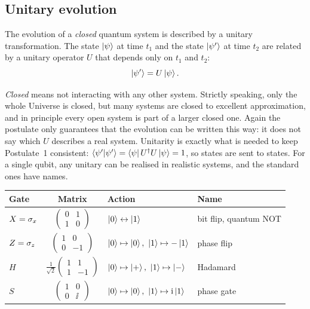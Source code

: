 \subsection{Unitary evolution}

\begin{postulate}[Evolution]\label{post:evolution}
  The evolution of a \emph{closed} quantum system is described by a unitary transformation. The state $\left|\psi\right\rangle$ at time $t_1$ and the state $\left|\psi'\right\rangle$ at time $t_2$ are related by a unitary operator $U$ that depends only on $t_1$ and $t_2$:
  \[
    \left|\psi'\right\rangle=U\left|\psi\right\rangle .
  \]
\end{postulate}

\emph{Closed} means not interacting with any other system. Strictly speaking, only the whole Universe is closed, but many systems are closed to excellent approximation, and in principle every open system is part of a larger closed one.
Again the postulate only guarantees that the evolution can be written this way: it does not say which $U$ describes a real system. Unitarity is exactly what is needed to keep Postulate~1 consistent: $\left\langle\psi'\middle|\psi'\right\rangle=\left\langle\psi\right| U^\dagger U\left|\psi\right\rangle=1$, so states are sent to states.
For a single qubit, any unitary can be realised in realistic systems, and the standard ones have names.

\begin{center}
\small
\begin{tabular}{@{}lcll@{}}
  \toprule
  Gate & Matrix & Action & Name\\
  \midrule
  $X=\sigma_x$ & $\begin{pmatrix}0&1\\1&0\end{pmatrix}$ & $\left|0\right\rangle\leftrightarrow\left|1\right\rangle$ & bit flip, quantum NOT\\[6pt]
  $Z=\sigma_z$ & $\begin{pmatrix}1&0\\0&-1\end{pmatrix}$ & $\left|0\right\rangle\mapsto\left|0\right\rangle,\ \left|1\right\rangle\mapsto-\left|1\right\rangle$ & phase flip\\[6pt]
  $H$ & $\frac1{\sqrt2}\begin{pmatrix}1&1\\1&-1\end{pmatrix}$ & $\left|0\right\rangle\mapsto\left|+\right\rangle,\ \left|1\right\rangle\mapsto\left|-\right\rangle$ & Hadamard\\[6pt]
  $S$ & $\begin{pmatrix}1&0\\0&\ii\end{pmatrix}$ & $\ket0\mapsto\ket0,\ \ket1\mapsto\ii\ket1$ & phase gate\\
  \bottomrule
\end{tabular}
\end{center}

